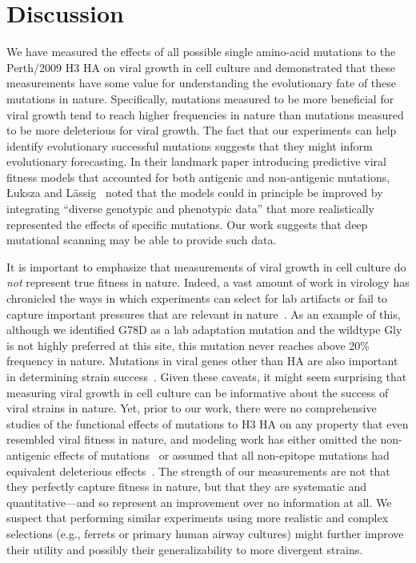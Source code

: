 \documentclass[9pt,twocolumn,twoside]{pnas-new}
\begin{document}
\section*{Discussion}
\label{sec:discussion}
We have measured the effects of all possible single amino-acid mutations to the Perth/2009 H3 HA on viral growth in cell culture and demonstrated that these measurements have some value for understanding the evolutionary fate of these mutations in nature.
Specifically, mutations measured to be more beneficial for viral growth tend to reach higher frequencies in nature than mutations measured to be more deleterious for viral growth.
The fact that our experiments can help identify evolutionary successful mutations suggests that they might inform evolutionary forecasting.
In their landmark paper introducing predictive viral fitness models that accounted for both antigenic and non-antigenic mutations, {\L}uksza and L{\"a}ssig~\cite{luksza2014predictive} noted that the models could in principle be improved by integrating ``diverse genotypic and phenotypic data'' that more realistically represented the effects of specific mutations.
Our work suggests that deep mutational scanning may be able to provide such data.

It is important to emphasize that measurements of viral growth in cell culture do \emph{not} represent true fitness in nature.
Indeed, a vast amount of work in virology has chronicled the ways in which experiments can select for lab artifacts or fail to capture important pressures that are relevant in nature~\cite{daniels1985fusion,sun2010modifications,lee2013comparison,wu2017structural}.
As an example of this, although we identified G78D as a lab adaptation mutation and the wildtype Gly is not highly preferred at this site, this mutation never reaches above 20\% frequency in nature.
Mutations in viral genes other than HA are also important in determining strain success~\cite{memoli2009recent,raghwani2017selection}.
Given these caveats, it might seem surprising that measuring viral growth in cell culture can be informative about the success of viral strains in nature.
Yet, prior to our work, there were no comprehensive studies of the functional effects of mutations to H3 HA on any property that even resembled viral fitness in nature, and modeling work has either omitted the non-antigenic effects of mutations~\cite{sun2013using,harvey2016identification,neher2016prediction} or assumed that all non-epitope mutations had equivalent deleterious effects~\cite{luksza2014predictive}.
The strength of our measurements are not that they perfectly capture fitness in nature, but that they are systematic and quantitative---and so represent an improvement over no information at all.
We suspect that performing similar experiments using more realistic and complex selections (e.g., ferrets or primary human airway cultures) might further improve their utility and possibly their generalizability to more divergent strains.
\end{document}
